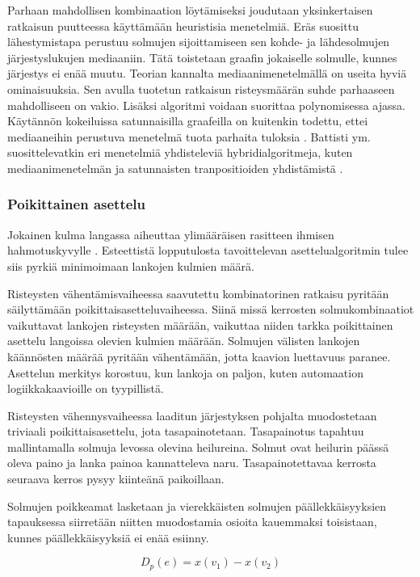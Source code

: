 \documentclass[finnish,12pt]{article}
\begin{document}
Parhaan mahdollisen kombinaation löytämiseksi joudutaan yksinkertaisen ratkaisun puutteessa käyttämään heuristisia menetelmiä.
Eräs suosittu lähestymistapa perustuu solmujen sijoittamiseen sen kohde- ja lähdesolmujen järjestyslukujen mediaaniin.
Tätä toistetaan graafin jokaiselle solmulle, kunnes järjestys ei enää muutu.
Teorian kannalta mediaanimenetelmällä on useita hyviä ominaisuuksia.
Sen avulla tuotetun ratkaisun risteysmäärän suhde parhaaseen mahdolliseen on vakio.
Lisäksi algoritmi voidaan suorittaa polynomisessa ajassa.
Käytännön kokeiluissa satunnaisilla graafeilla on kuitenkin todettu, ettei mediaaneihin perustuva menetelmä tuota parhaita tuloksia \cite{RefWorks:52}. 
Battisti ym. suosittelevatkin eri menetelmiä yhdisteleviä hybridialgoritmeja, kuten mediaanimenetelmän ja satunnaisten tranpositioiden yhdistämistä \cite{RefWorks:39}.

				\subsubsection{Poikittainen asettelu}
				
Jokainen kulma langassa aiheuttaa ylimääräisen rasitteen ihmisen hahmotuskyvylle \cite{RefWorks:47}. 
Esteettistä lopputulosta tavoittelevan asettelualgoritmin tulee siis pyrkiä minimoimaan lankojen kulmien määrä.

Risteysten vähentämisvaiheessa saavutettu kombinatorinen ratkaisu pyritään säilyttämään poikittaisasetteluvaiheessa.
Siinä missä kerrosten solmukombinaatiot vaikuttavat lankojen risteysten määrään, vaikuttaa niiden tarkka poikittainen asettelu langoissa olevien kulmien määrään.
Solmujen välisten lankojen käännösten määrää pyritään vähentämään, jotta kaavion luettavuus paranee.
Asettelun merkitys korostuu, kun lankoja on paljon, kuten automaation logiikkakaavioille on tyypillistä.

Risteysten vähennysvaiheessa laaditun järjestyksen pohjalta muodostetaan triviaali poikittaisasettelu, jota tasapainotetaan.
Tasapainotus tapahtuu mallintamalla solmuja levossa olevina heilureina.
Solmut ovat heilurin päässä oleva paino ja lanka painoa kannatteleva naru.
Tasapainotettavaa kerrosta seuraava kerros pysyy kiinteänä paikoillaan.

Solmujen poikkeamat lasketaan ja vierekkäisten solmujen päällekkäisyyksien tapauksessa siirretään niitten muodostamia osioita kauemmaksi toisistaan, kunnes päällekkäisyyksiä ei enää esiinny.

\begin{equation}
	D_p(e)=x(v_1)-x(v_2)
\end{equation}
\end{document}
